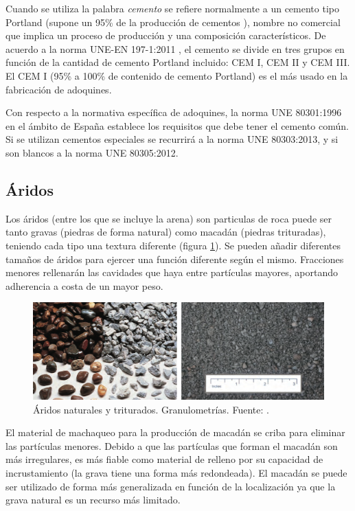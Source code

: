 Cuando se utiliza la palabra \emph{cemento} se refiere normalmente a un cemento tipo Portland (supone un 95\% de la producción de cementos \cite{jsjunnesson}), nombre no comercial que implica un proceso de producción y una composición característicos. De acuerdo a la norma UNE-EN 197-1:2011 \cite{une1971}, el cemento se divide en tres grupos en función de la cantidad de cemento Portland incluido: CEM I, CEM II y CEM III. El CEM I (95\% a 100\% de contenido de cemento Portland) es el más usado en la fabricación de adoquines.

Con respecto a la normativa específica de adoquines, la norma UNE 80301:1996 \cite{une80301} en el ámbito de España establece los requisitos que debe tener el cemento común. Si se utilizan cementos especiales se recurrirá a la norma UNE 80303:2013, y si son blancos a la norma UNE 80305:2012.

\subsection{Áridos}
Los áridos (entre los que se incluye la arena) son particulas de roca puede ser tanto gravas (piedras de forma natural) como macadán (piedras trituradas), teniendo cada tipo una textura diferente (figura \ref{fig:aridosnaturalesytriturados}). Se pueden añadir diferentes tamaños de áridos para ejercer una función diferente según el mismo. Fracciones menores rellenarán las cavidades que haya entre partículas mayores, aportando adherencia a costa de un mayor peso.

\begin{figure}[!htb]
\centering
\includegraphics[width=13cm]{aridos.png}
\caption[Áridos naturales y triturados. Granulometrías.]{Áridos naturales y triturados. Granulometrías. Fuente: \cite{sustpave}.}
\label{fig:aridosnaturalesytriturados}
\end{figure}

El material de machaqueo para la producción de macadán se criba para eliminar las partículas menores. Debido a que las partículas que forman el macadán son más irregulares, es más fiable como material de relleno por su capacidad de incrustamiento (la grava tiene una forma más redondeada). El macadán se puede ser utilizado de forma más generalizada en función de la localización ya que la grava natural es un recurso más limitado.


